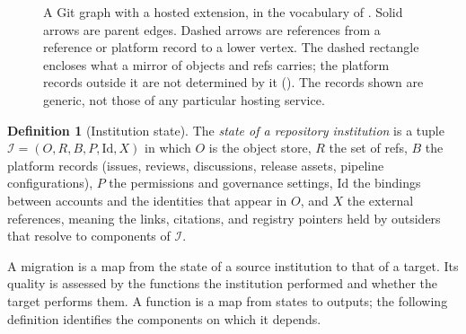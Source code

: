 \documentclass[11pt,twoside,openright]{book}
\theoremstyle{plain}
\theoremstyle{definition}
\newtheorem{definition}[theorem]{Definition}
\theoremstyle{remark}
\begin{document}
\begin{figure}[t]
\centering
{}
\caption{A Git graph with a hosted extension, in the vocabulary of . Solid arrows are parent edges. Dashed arrows are references from a reference or platform record to a lower vertex. The dashed rectangle encloses what a mirror of objects and refs carries; the platform records outside it are not determined by it (). The records shown are generic, not those of any particular hosting service.}
\label{fig:gitvshosted}
\end{figure}

\begin{definition}[Institution state]\label{def:instate}
The \emph{state of a repository institution} is a tuple $\mathcal{I}=(O,R,B,P,\mathrm{Id},X)$ in which $O$ is the object store, $R$ the set of refs, $B$ the platform records (issues, reviews, discussions, release assets, pipeline configurations), $P$ the permissions and governance settings, $\mathrm{Id}$ the bindings between accounts and the identities that appear in $O$, and $X$ the external references, meaning the links, citations, and registry pointers held by outsiders that resolve to components of $\mathcal{I}$.
\end{definition}

A migration is a map from the state of a source institution to that of a target. Its quality is assessed by the functions the institution performed and whether the target performs them. A function is a map from states to outputs; the following definition identifies the components on which it depends.
\end{document}
